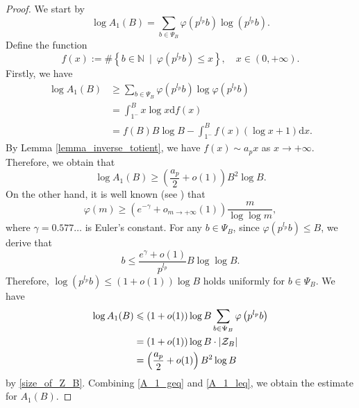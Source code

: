 \documentclass[12pt]{article}
\numberwithin{equation}{section}
\begin{document}
\begin{proof}
	We start by 
	\[\log A_1(B) = \sum_{b \in \Psi_B} \varphi\left(p^{l_p}b\right) \log\left(p^{l_p}b\right). \] Define the function \[ f(x) := \#\left\{ b \in \mathbb{N} ~\mid~ \varphi(p^{l_p}b) \leqslant x \right\}, \quad x \in (0,+\infty). \]
	Firstly, we have
	\begin{align*}
		\log A_1(B) &\geqslant  \sum_{b \in \Psi_B} \varphi\left(p^{l_p}b\right) \log\varphi\left(p^{l_p}b\right) \\
		&= \int_{1^{-}}^{B} x\log x \mathrm{d} f(x) \\
		&= f(B)B\log B - \int_{1^{-}}^{B} f(x)(\log x + 1)\mathrm{d}x.
	\end{align*}
By Lemma \ref{lemma_inverse_totient}, we have $f(x) \sim a_p x$ as $x \to +\infty$. Therefore, we obtain that 
\begin{equation}\label{A_1_geq}
	\log A_1(B) \geqslant \left(\frac{a_p}{2}+o(1)\right)B^2\log B. 
\end{equation} 
On the other hand, it is well known (see \cite[Theorem 2.9]{MV2006}) that
\[ \varphi(m) \geqslant (e^{-\gamma}+o_{m \to +\infty}(1))\frac{m}{\log\log m}, \]
where $\gamma = 0.577\ldots$ is Euler's constant. For any $b \in \Psi_{B}$, since $\varphi\left(p^{l_p}b\right) \leqslant B$, we derive that
\begin{equation}\label{upper_bound_for_elements_in_Psi_B}
	b \leqslant \frac{e^{\gamma}+o(1)}{p^{l_p}}B\log\log B.
\end{equation}
Therefore, $\log\left(p^{l_p}b\right) \leqslant (1+o(1))\log B$ holds uniformly for $b \in \Psi_B$. We have 
\begin{align}
	\log A_1(B) &\leqslant (1+o(1))\log B \sum_{b \in \Psi_B} \varphi\left(p^{l_p}b\right) \notag\\
	&= (1+o(1))\log B \cdot |\mathcal{Z}_B| \notag\\
	&= \left(\frac{a_p}{2}+o(1)\right)B^2\log B \label{A_1_leq}
\end{align}
by \eqref{size_of_Z_B}. Combining \eqref{A_1_geq} and \eqref{A_1_leq}, we obtain the estimate for $A_1(B)$.


\end{proof}
\end{document}
